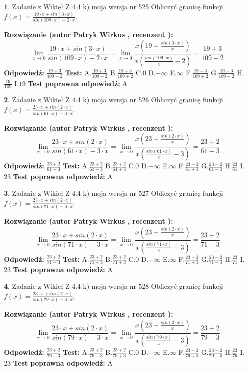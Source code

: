 \documentclass[12pt, a4paper]{article}
\theoremstyle{definition} %
\newtheorem{zad}{}
\newcommand{\zadStart}[1]{\begin{zad}#1\newline}
\newcommand{\zadStop}{\end{zad}}
\newcommand{\rozwStart}[2]{\noindent \textbf{Rozwiązanie (autor #1 , recenzent #2): }\newline}
\newcommand{\rozwStop}{\newline}
\newcommand{\odpStart}{\noindent \textbf{Odpowiedź:}\newline}
\newcommand{\odpStop}{\newline}
\newcommand{\testStart}{\noindent \textbf{Test:}\newline}
\newcommand{\testStop}{\newline}
\newcommand{\kluczStart}{\noindent \textbf{Test poprawna odpowiedź:}\newline}
\newcommand{\kluczStop}{\newline}
\begin{document}
\zadStart{Zadanie z Wikieł Z 4.4 k) moja wersja nr 525}
Obliczyć granicę funkcji $f(x)=\frac{19\cdot x +sin(3\cdot x)}{sin(109\cdot x) -2\cdot x}$.
\zadStop
\rozwStart{Patryk Wirkus}{}
$$\lim\limits_{x\to 0}\frac{19\cdot x +sin(3\cdot x)}{sin(109\cdot x) -2\cdot x}
=\lim\limits_{x\to 0}\frac{x(19+\frac{sin(3\cdot x)}{x})}{x(\frac{sin(109\cdot x)}{x}-2)}
=\frac{19+3}{109-2}$$
\rozwStop
\odpStart
$\frac{19+3}{109-2}$
\odpStop
\testStart
A.$\frac{19+3}{109-2}$
B.$\frac{19+3}{109+2}$
C.$0$
D.$-\infty$
E.$\infty$
F.$\frac{19-3}{109+2}$
G.$\frac{19-3}{109-2}$
H.$\frac{19}{109}$
I.$19$
\testStop
\kluczStart
A
\kluczStop



\zadStart{Zadanie z Wikieł Z 4.4 k) moja wersja nr 526}
Obliczyć granicę funkcji $f(x)=\frac{23\cdot x +sin(2\cdot x)}{sin(61\cdot x) -3\cdot x}$.
\zadStop
\rozwStart{Patryk Wirkus}{}
$$\lim\limits_{x\to 0}\frac{23\cdot x +sin(2\cdot x)}{sin(61\cdot x) -3\cdot x}
=\lim\limits_{x\to 0}\frac{x(23+\frac{sin(2\cdot x)}{x})}{x(\frac{sin(61\cdot x)}{x}-3)}
=\frac{23+2}{61-3}$$
\rozwStop
\odpStart
$\frac{23+2}{61-3}$
\odpStop
\testStart
A.$\frac{23+2}{61-3}$
B.$\frac{23+2}{61+3}$
C.$0$
D.$-\infty$
E.$\infty$
F.$\frac{23-2}{61+3}$
G.$\frac{23-2}{61-3}$
H.$\frac{23}{61}$
I.$23$
\testStop
\kluczStart
A
\kluczStop



\zadStart{Zadanie z Wikieł Z 4.4 k) moja wersja nr 527}
Obliczyć granicę funkcji $f(x)=\frac{23\cdot x +sin(2\cdot x)}{sin(71\cdot x) -3\cdot x}$.
\zadStop
\rozwStart{Patryk Wirkus}{}
$$\lim\limits_{x\to 0}\frac{23\cdot x +sin(2\cdot x)}{sin(71\cdot x) -3\cdot x}
=\lim\limits_{x\to 0}\frac{x(23+\frac{sin(2\cdot x)}{x})}{x(\frac{sin(71\cdot x)}{x}-3)}
=\frac{23+2}{71-3}$$
\rozwStop
\odpStart
$\frac{23+2}{71-3}$
\odpStop
\testStart
A.$\frac{23+2}{71-3}$
B.$\frac{23+2}{71+3}$
C.$0$
D.$-\infty$
E.$\infty$
F.$\frac{23-2}{71+3}$
G.$\frac{23-2}{71-3}$
H.$\frac{23}{71}$
I.$23$
\testStop
\kluczStart
A
\kluczStop



\zadStart{Zadanie z Wikieł Z 4.4 k) moja wersja nr 528}
Obliczyć granicę funkcji $f(x)=\frac{23\cdot x +sin(2\cdot x)}{sin(79\cdot x) -3\cdot x}$.
\zadStop
\rozwStart{Patryk Wirkus}{}
$$\lim\limits_{x\to 0}\frac{23\cdot x +sin(2\cdot x)}{sin(79\cdot x) -3\cdot x}
=\lim\limits_{x\to 0}\frac{x(23+\frac{sin(2\cdot x)}{x})}{x(\frac{sin(79\cdot x)}{x}-3)}
=\frac{23+2}{79-3}$$
\rozwStop
\odpStart
$\frac{23+2}{79-3}$
\odpStop
\testStart
A.$\frac{23+2}{79-3}$
B.$\frac{23+2}{79+3}$
C.$0$
D.$-\infty$
E.$\infty$
F.$\frac{23-2}{79+3}$
G.$\frac{23-2}{79-3}$
H.$\frac{23}{79}$
I.$23$
\testStop
\kluczStart
A
\kluczStop
\end{document}
